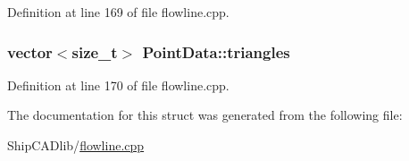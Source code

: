 Definition at line 169 of file flowline.\+cpp.

\subsubsection[{\texorpdfstring{triangles}{triangles}}]{\setlength{\rightskip}{0pt plus 5cm}vector$<$size\+\_\+t$>$ Point\+Data\+::triangles}\hypertarget{structPointData_a7de97589578b881bc7850ac0053c8613}{}\label{structPointData_a7de97589578b881bc7850ac0053c8613}


Definition at line 170 of file flowline.\+cpp.



The documentation for this struct was generated from the following file\+:\begin{DoxyCompactItemize}
\item 
Ship\+C\+A\+Dlib/\hyperlink{flowline_8cpp}{flowline.\+cpp}\end{DoxyCompactItemize}
